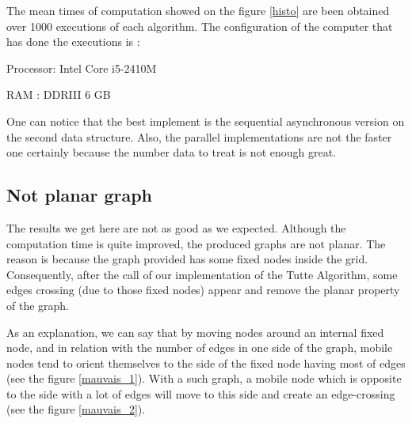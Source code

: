 The mean times of computation showed on the figure \ref{histo} are been
obtained over 1000 executions of each algorithm. The configuration of the
computer that has done the executions is :
\begin{description}
\item {Processor}: Intel Core i5-2410M
\item {RAM} : DDRIII 6 GB
\end{description}

One can notice that the best implement is the sequential asynchronous
version on the second data structure. Also, the parallel implementations
are not the faster one certainly because the number data to treat is not
enough great.

\subsection{Not planar graph}
The results we get here are not as good as we expected. Although the
computation time is quite improved, the produced graphs are not planar. The
reason is because the graph provided has some fixed nodes inside the
grid. Consequently, after the call of our implementation of the Tutte
Algorithm, some edges crossing (due to those fixed nodes) appear and remove
the planar property of the graph.

As an explanation, we can say that by moving nodes around an internal fixed
node, and in relation with the number of edges in one side of the graph, mobile
nodes tend to orient themselves to the side of the fixed node having
most of edges (see the figure \ref{mauvais_1}). With a such graph, a
mobile node which is opposite to the side with a lot of edges will move to
this side and create an edge-crossing (see the figure \ref{mauvais_2}).

